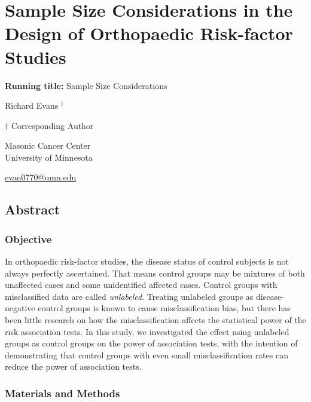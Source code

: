 \documentclass[
]{article}
\author{}
\date{\vspace{-2.5em}}
\begin{document}
\hypertarget{sample-size-considerations-in-the-design-of-orthopaedic-risk-factor-studies}{%
\section{Sample Size Considerations in the Design of Orthopaedic
Risk-factor
Studies}\label{sample-size-considerations-in-the-design-of-orthopaedic-risk-factor-studies}}

\textbf{Running title:} Sample Size Considerations

Richard Evans \({^\dagger}\)

\({\dagger}\) Corresponding Author

Masonic Cancer Center\\
University of Minnesota

\href{mailto:evan0770@umn.edu}{evan0770@umn.edu}

\newpage

\hypertarget{abstract}{%
\subsection{Abstract}\label{abstract}}

\hypertarget{objective}{%
\subsubsection{Objective}\label{objective}}

In orthopaedic risk-factor studies, the disease status of control
subjects is not always perfectly ascertained. That means control groups
may be mixtures of both unaffected cases and some unidentified affected
cases. Control groups with misclassified data are called
\emph{unlabeled}. Treating unlabeled groups as disease-negative control
groups is known to cause misclassification bias, but there has been
little research on how the misclassification affects the statistical
power of the risk association tests. In this study, we investigated the
effect using unlabeled groups as control groups on the power of
association tests, with the intention of demonstrating that control
groups with even small misclassification rates can reduce the power of
association tests.

\hypertarget{materials-and-methods}{%
\subsubsection{Materials and Methods}\label{materials-and-methods}}
\end{document}

